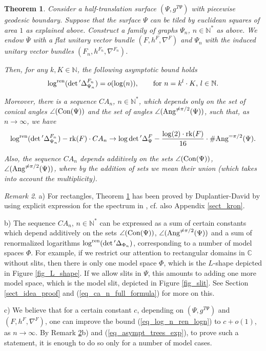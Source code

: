\documentclass[12pt]{article}
\numberwithin{equation}{section}
\theoremstyle{theorem}
\newtheorem{thm}{Theorem}[section]
\theoremstyle{definition}
\theoremstyle{remark}
\newtheorem{rem}[thm]{Remark}
\newcommand{\comp}{\mathbb{C}}
\newcommand{\nat}{\mathbb{N}}
\newcommand{\laplcomp}{\Delta}
\newcommand{\rk}[1]{{\rm{rk}} ( #1 )}
\begin{document}
	\begin{thm}\label{thm_asympt_exansion}
		Consider a \textit{half-translation} surface $(\Psi, g^{T \Psi})$ with piecewise geodesic boundary. Suppose that the surface $\Psi$ can be tiled by euclidean squares of area $1$ as explained above.  Construct a family of graphs $\Psi_n$, $n \in \nat^*$ as above.
		We endow $\overline{\Psi}$ with a flat unitary vector bundle $(F, h^F, \nabla^F)$ and $\Psi_n$ with the induced unitary vector bundles $(F_n, h^{F_n}, \nabla^{F_n})$. 
		\par 
		Then, for any $k, K \in \nat$, the following asymptotic bound holds
		\begin{equation}\label{eq_log_n_ren_logn}
			\log^{{\rm{ren}}} (\det{}'\laplcomp_{\Psi_n}^{F_n}) = o(\log(n)), \qquad \text{for $n = k^l \cdot K$, $l \in \nat$}. 
		\end{equation}
		\par Moreover, there is a sequence $CA_n$, $n \in \nat^*$, which depends only on the set of conical angles $\angle({\rm{Con}}(\Psi))$ and the set of angles $\angle({\rm{Ang}}^{\neq \pi/2}(\Psi))$, such that, as $n \to \infty$, we have
		\begin{equation}\label{eq_asympt_trees_exp}
			\log^{{\rm{ren}}} (\det{}'\laplcomp_{\Psi_n}^{F_n}) - \rk{F} \cdot CA_n \to \log \det{}' \laplcomp_{\Psi}^{F} - \frac{\log(2) \cdot \rk{F}}{16} \cdot \# {\rm{Ang}}^{= \pi/2}(\Psi).
		\end{equation}
		\par Also, the sequence $CA_n$ depends additively on the sets $\angle({\rm{Con}}(\Psi))$, $\angle({\rm{Ang}}^{\neq \pi/2}(\Psi))$, where by the addition of sets we mean their union (which takes into account the multiplicity).
	\end{thm}
	\begin{rem}\label{rem_main_thm}
		a) For rectangles, Theorem \ref{thm_asympt_exansion} has been proved by Duplantier-David by using explicit expression for the spectrum in \cite[(4.7) and (4.23)]{DuplDav}, cf. also Appendix \ref{sect_kron}.
		\par
		b) The sequence $CA_n$, $n \in \nat^*$ can be expressed as a sum of certain constants which depend additively on the sets $\angle({\rm{Con}}(\Psi))$, $\angle({\rm{Ang}}^{\neq \pi/2}(\Psi))$ and a sum of renormalized logarithms $\log^{{\rm{ren}}} (\det{}' \laplcomp_{\Phi_n})$, corresponding to a number of model spaces $\Phi$.
		For example, if we restrict our attention to rectangular domains in $\comp$ without slits, then there is only one model space $\Phi$, which is the $L$-shape depicted in Figure \ref{fig_L_shape}.
		If we allow slits in $\Psi$, this amounts to adding one more model space, which is the model slit, depicted in Figure \ref{fig_slit}.
		See Section \ref{sect_idea_proof} and (\ref{eq_ca_n_full_formula}) for more on this.
		\par 
		c) We believe that for a certain constant $c$, depending on $(\Psi, g^{T \Psi})$ and $(F, h^F, \nabla^F)$, one can improve the bound (\ref{eq_log_n_ren_logn}) to $c + o(1)$, as $n \to \infty$. By Remark \ref{rem_main_thm}b) and (\ref{eq_asympt_trees_exp}), to prove such a statement, it is enough to do so only for a number of model cases.
	\end{rem}
\end{document}
